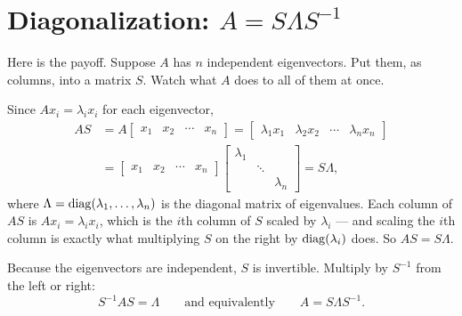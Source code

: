 \section{Diagonalization: \texorpdfstring{$A=S\Lambda S^{-1}$}{A = S Lambda S inverse}}

Here is the payoff. Suppose $A$ has $n$ independent eigenvectors. Put them, as columns, into a matrix $S$. Watch what $A$ does to all of them at once.

Since $Ax_i=\lambda_i x_i$ for each eigenvector,
\[
   \begin{aligned}
   AS &= A\begin{bmatrix} x_1 & x_2 & \cdots & x_n\end{bmatrix}
       = \begin{bmatrix} \lambda_1 x_1 & \lambda_2 x_2 & \cdots & \lambda_n x_n\end{bmatrix}\\
      &= \begin{bmatrix} x_1 & x_2 & \cdots & x_n\end{bmatrix}
         \begin{bmatrix} \lambda_1 & & \\ & \ddots & \\ & & \lambda_n\end{bmatrix}
       = S\Lambda ,
   \end{aligned}
\]
where $\Lambda=\operatorname{diag}(\lambda_1,\dots,\lambda_n)$ is the diagonal matrix of eigenvalues. Each column of $AS$ is $A x_i = \lambda_i x_i$, which is the $i$th column of $S$ scaled by $\lambda_i$ --- and scaling the $i$th column is exactly what multiplying $S$ on the right by $\operatorname{diag}(\lambda_i)$ does. So $AS=S\Lambda$.

Because the eigenvectors are independent, $S$ is invertible. Multiply by $S^{-1}$ from the left or right:
\[
   S^{-1}AS = \Lambda
   \qquad\text{and equivalently}\qquad
   A = S\Lambda S^{-1} .
\]


